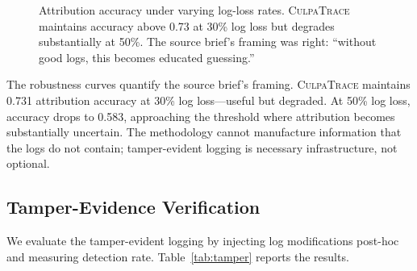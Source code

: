\documentclass[sigconf,nonacm]{acmart}
\begin{document}
\begin{figure}[h]
\centering
{}
\caption{Attribution accuracy under varying log-loss rates.
  \textsc{CulpaTrace} maintains accuracy above 0.73 at 30\% log loss
  but degrades substantially at 50\%. The source brief's framing
  was right: ``without good logs, this becomes educated guessing.''}
\label{fig:logloss}
\end{figure}

The robustness curves quantify the source brief's framing.
\textsc{CulpaTrace} maintains 0.731 attribution accuracy at 30\%
log loss---useful but degraded. At 50\% log loss, accuracy drops
to 0.583, approaching the threshold where attribution becomes
substantially uncertain. The methodology cannot manufacture
information that the logs do not contain; tamper-evident logging
is necessary infrastructure, not optional.

\subsection{Tamper-Evidence Verification}

We evaluate the tamper-evident logging by injecting log
modifications post-hoc and measuring detection rate.
Table~\ref{tab:tamper} reports the results.
\end{document}
